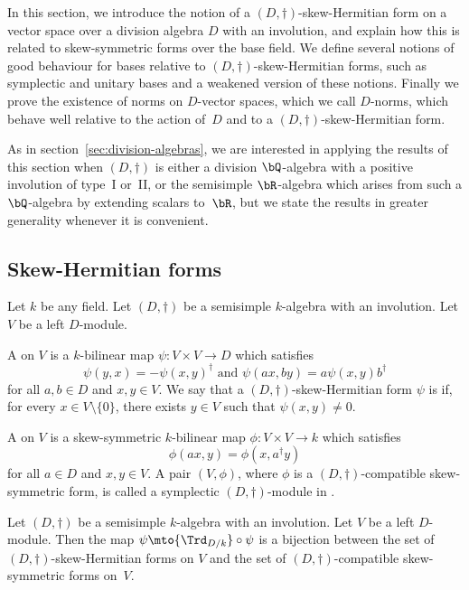In this section, we introduce the notion of a $(D,\dag)$-skew-Hermitian form on a vector space over a division algebra $D$ with an involution, and explain how this is related to skew-symmetric forms over the base field. We define several notions of good behaviour for bases relative to $(D,\dag)$-skew-Hermitian forms, such as symplectic and unitary bases and a weakened version of these notions. Finally we prove the existence of norms on $D$-vector spaces, which we call $D$-norms, which behave well relative to the action of~$D$ and to a $(D,\dag)$-skew-Hermitian form.

As in section~\ref{sec:division-algebras}, we are interested in applying the results of this section when $(D, \dag)$ is either a division $\bQ$-algebra with a positive involution of type~I or~II, or the semisimple $\bR$-algebra which arises from such a $\bQ$-algebra by extending scalars to~$\bR$, but we state the results in greater generality whenever it is convenient.

\subsection{Skew-Hermitian forms} \label{subsec:skew-hermitian-forms}

Let $k$ be any field.
Let $(D, \dag)$ be a semisimple $k$\nobreakdash-algebra with an involution.
Let $V$ be a left $D$-module.

A  on $V$ is a $k$-bilinear map $\psi \colon V \times V \to D$ which satisfies
\[
\psi(y,x) = -\psi(x,y)^\dag \text{ and } \psi(ax, by) = a\psi(x,y)b^\dag
\]
for all $a, b \in D$ and $x,y \in V$.
We say that a $(D,\dag)$-skew-Hermitian form $\psi$ is  if, for every $x \in V \setminus \{0\}$, there exists $y \in V$ such that $\psi(x,y) \neq 0$.

A  on $V$ is a skew-symmetric $k$-bilinear map $\phi \colon V \times V \to k$ which satisfies
\[
\phi(ax, y) = \phi(x, a^\dag y)
\]
for all $a \in D$ and $x,y \in V$.
A pair $(V,\phi)$, where $\phi$ is a $(D,\dag)$-compatible skew-symmetric form, is called a symplectic $(D,\dag)$-module in \cite[\S 8]{Mil05}.

\begin{lemma} \label{tr-skew-hermitian-form}
Let $(D, \dag)$ be a semisimple $k$-algebra with an involution.
Let $V$ be a left $D$-module.
Then the map $\psi \mto {\Trd_{D/k}} \circ \psi$ is a bijection between the set of $(D,\dag)$-skew-Hermitian forms on $V$ and the set of $(D,\dag)$-compatible skew-symmetric forms on~$V$.
\end{lemma}

